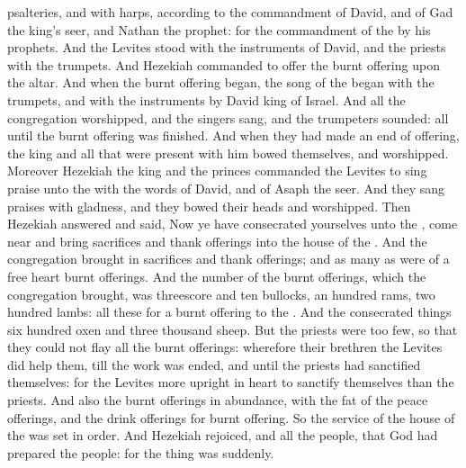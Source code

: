 {psalteries, and with
harps, according to the
commandment of
David, and of
Gad the
king’s
seer, and
Nathan the
prophet: for
{} the
commandment
of the
{}
by his
prophets.
And the
Levites
stood with the
instruments of
David, and the
priests with the
trumpets.
And
Hezekiah
commanded to
offer the burnt
offering upon the
altar. And
when the burnt
offering
began, the
song of the
{}
began
{} with the
trumpets, and with the
instruments
{}
by
David
king of
Israel.
And all the
congregation
worshipped, and the
singers
sang, and the
trumpeters
sounded:
{} all
{} until the burnt
offering was
finished.
And when they had made an
end of
offering, the
king and all that were
present with him
bowed themselves, and
worshipped.
Moreover
Hezekiah the
king and the
princes
commanded the
Levites to sing
praise unto the
{} with the
words of
David, and of
Asaph the
seer. And they sang
praises with
gladness, and they bowed their
heads and
worshipped.
Then
Hezekiah
answered and
said, Now ye have
consecrated yourselves unto the
{}, come
near and
bring
sacrifices and thank
offerings into the
house of the
{}. And the
congregation brought
in
sacrifices and thank
offerings; and as many as were of a
free
heart burnt
offerings.
And the
number of the burnt
offerings, which the
congregation
brought, was threescore and
ten
bullocks, an
hundred
rams,
{} two
hundred
lambs: all these
{} for a burnt
offering to the
{}.
And the consecrated
things
{}
six
hundred
oxen and
three
thousand
sheep.
But the
priests were too
few, so that they
could not
flay all the burnt
offerings: wherefore their
brethren the
Levites did
help them, till the
work was
ended, and until the
{}
priests had
sanctified themselves: for the
Levites
{} more
upright in
heart to
sanctify themselves than the
priests.
And also the burnt
offerings
{} in
abundance, with the
fat of the peace
offerings, and the drink
offerings for
{} burnt
offering. So the
service of the
house of the
{} was set in
order.
And
Hezekiah
rejoiced, and all the
people, that
God had
prepared the
people: for the
thing was
{}
suddenly.

}
